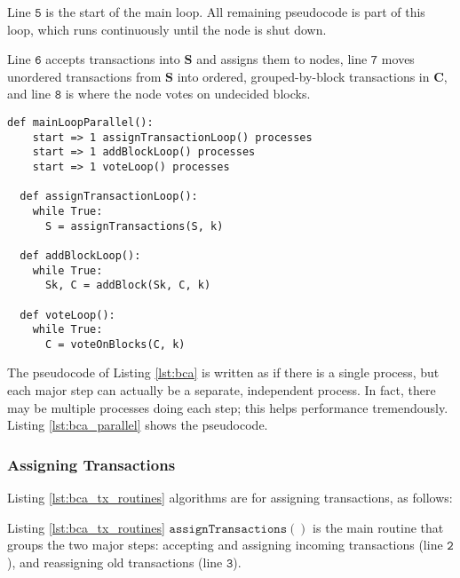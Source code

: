 Line $\mathtt{5}$ is the start of the main loop. All remaining pseudocode is part of this loop, which runs continuously until the node is shut down.

Line $\mathtt{6}$ accepts transactions into $\mathbf{S}$ and assigns them to nodes, line $\mathtt{7}$ moves unordered transactions from $\mathbf{S}$ into ordered, grouped-by-block transactions in $\mathbf{C}$, and line $\mathtt{8}$ is where the node votes on undecided blocks.

\begin{minipage}{\linewidth}
  \begin{lstlisting}[caption={Parallel version of BigchainDB Consensus Algorithm.}, label={lst:bca_parallel}, style=python]
  def mainLoopParallel():
    start => 1 assignTransactionLoop() processes 
    start => 1 addBlockLoop() processes 
    start => 1 voteLoop() processes
    
  def assignTransactionLoop():
    while True:
      S = assignTransactions(S, k)
  
  def addBlockLoop():
    while True:
      Sk, C = addBlock(Sk, C, k)
  
  def voteLoop():
    while True:
      C = voteOnBlocks(C, k)
  \end{lstlisting}
\end{minipage}

The pseudocode of Listing \ref{lst:bca} is written as if there is a single process, but each major step can actually be a separate, independent process.
In fact, there may be multiple processes doing each step; this helps performance tremendously.
Listing \ref{lst:bca_parallel} shows the pseudocode.

\subsubsection{Assigning Transactions}

\medskip
\noindent Listing \ref{lst:bca_tx_routines} algorithms are for assigning transactions, as follows:

Listing \ref{lst:bca_tx_routines} $\mathtt{assignTransactions()}$ is the main routine that groups the two major steps: accepting and assigning incoming transactions (line $\mathtt{2}$), and reassigning old transactions (line $\mathtt{3}$).

